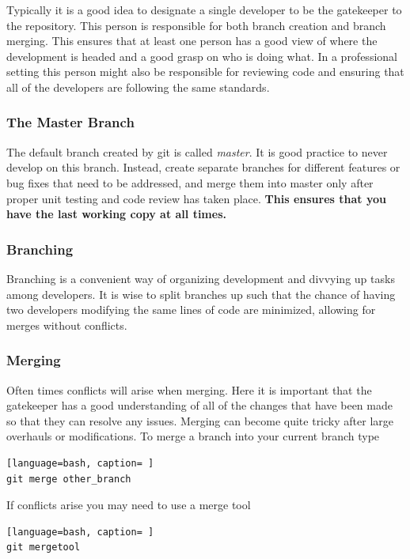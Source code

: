 Typically it is a good idea to designate a single developer to be the gatekeeper to the repository. This person is responsible for both branch creation and branch merging. This ensures that at least one person has a good view of where the development is headed and a good grasp on who is doing what. In a professional setting this person might also be responsible for reviewing code and ensuring that all of the developers are following the same standards. 

\subsubsection{The Master Branch}

The default branch created by git is called \textit{master}. It is good practice to never develop on this branch. Instead, create separate branches for different features or bug fixes that need to be addressed, and merge them into master only after proper unit testing and code review has taken place. \textbf{This ensures that you have the last working copy at all times.}

\subsubsection{Branching}

Branching is a convenient way of organizing development and divvying up tasks among developers. It is wise to split branches up such that the chance of having two developers modifying the same lines of code are minimized, allowing for merges without conflicts. 

\subsubsection{Merging}

Often times conflicts will arise when merging. Here it is important that the gatekeeper has a good understanding of all of the changes that have been made so that they can resolve any issues. Merging can become quite tricky after large overhauls or modifications. To merge a branch into your current branch type

\begin{lstlisting}[language=bash, caption= ]
git merge other_branch
\end{lstlisting}

\noindent
If conflicts arise you may need to use a merge tool

\begin{lstlisting}[language=bash, caption= ]
git mergetool
\end{lstlisting}

